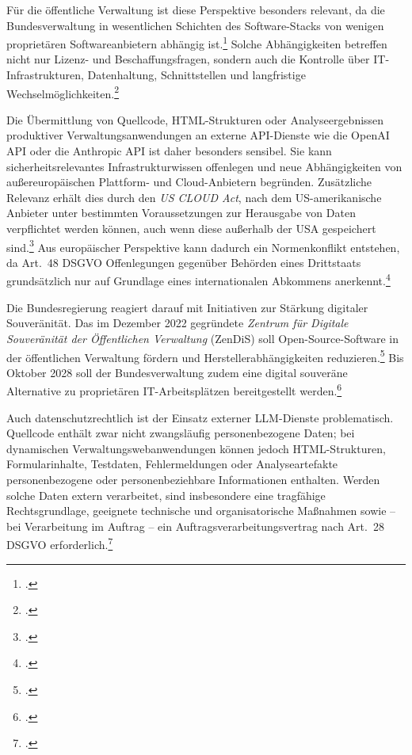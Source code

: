 Für die öffentliche Verwaltung ist diese Perspektive besonders relevant, da die Bundesverwaltung in wesentlichen Schichten des Software-Stacks von wenigen proprietären Softwareanbietern abhängig ist.\footcite[Vgl.][S.~3--4]{strategyAndPwCMarktanalyse2019} Solche Abhängigkeiten betreffen nicht nur Lizenz- und Beschaffungsfragen, sondern auch die Kontrolle über IT-Infrastrukturen, Datenhaltung, Schnittstellen und langfristige Wechselmöglichkeiten.\footcite[Vgl.][S.~9--10]{goldackerDigitaleSouveraenitaet}

Die Übermittlung von Quellcode, \acs{HTML}-Strukturen oder Analyseergebnissen produktiver Verwaltungsanwendungen an externe \ac{API}-Dienste wie die OpenAI \ac{API} oder die Anthropic \ac{API} ist daher besonders sensibel. Sie kann sicherheitsrelevantes Infrastrukturwissen offenlegen und neue Abhängigkeiten von außereuropäischen Plattform- und Cloud-Anbietern begründen. Zusätzliche Relevanz erhält dies durch den \textit{US CLOUD Act}, nach dem US-amerikanische Anbieter unter bestimmten Voraussetzungen zur Herausgabe von Daten verpflichtet werden können, auch wenn diese außerhalb der USA gespeichert sind.\footcite[Vgl.][]{cloudact2018} Aus europäischer Perspektive kann dadurch ein Normenkonflikt entstehen, da Art.~48 \ac{DSGVO} Offenlegungen gegenüber Behörden eines Drittstaats grundsätzlich nur auf Grundlage eines internationalen Abkommens anerkennt.\footcite[Vgl.][S.~3--5]{edpbEdpsCloudAct2019}

Die Bundesregierung reagiert darauf mit Initiativen zur Stärkung digitaler Souveränität. Das im Dezember 2022 gegründete \textit{Zentrum für Digitale Souveränität der Öffentlichen Verwaltung} (\mbox{ZenDiS}) soll Open-Source-Software in der öffentlichen Verwaltung fördern und Hersteller\-abhängigkeiten reduzieren.\footcite[Vgl.][]{bmds_digitale_souveraenitaet} Bis Oktober 2028 soll der Bundesverwaltung zudem eine digital souveräne Alternative zu proprietären IT-Arbeitsplätzen bereitgestellt werden.\footcite[Vgl.][]{bmds_souveraener_arbeitsplatz}

Auch datenschutzrechtlich ist der Einsatz externer \ac{LLM}-Dienste problematisch. Quellcode enthält zwar nicht zwangsläufig personenbezogene Daten; bei dynamischen Verwaltungswebanwendungen können jedoch \acs{HTML}-Strukturen, Formularinhalte, Testdaten, Fehlermeldungen oder Analyseartefakte personenbezogene oder personenbeziehbare Informationen enthalten. Werden solche Daten extern verarbeitet, sind insbesondere eine tragfähige Rechtsgrundlage, geeignete technische und organisatorische Maßnahmen sowie -- bei Verarbeitung im Auftrag -- ein Auftragsverarbeitungsvertrag nach Art.~28 \ac{DSGVO} erforderlich.\footcite[Vgl.][Art.~4, Art.~28 Abs.~1 und 3, Art.~32]{dsgvo2016}

